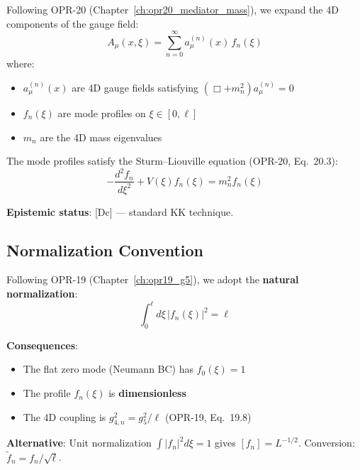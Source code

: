 Following OPR-20 (Chapter~\ref{ch:opr20_mediator_mass}), we expand the 4D components
of the gauge field:
\begin{equation}
    A_\mu(x,\xi) = \sum_{n=0}^{\infty} a_\mu^{(n)}(x) \, f_n(\xi)
    \label{eq:ch19_kk_expansion}
\end{equation}
where:
\begin{itemize}
    \item $a_\mu^{(n)}(x)$ are 4D gauge fields satisfying $(\Box + m_n^2) a_\mu^{(n)} = 0$
    \item $f_n(\xi)$ are mode profiles on $\xi \in [0, \ell]$
    \item $m_n$ are the 4D mass eigenvalues
\end{itemize}

The mode profiles satisfy the Sturm--Liouville equation (OPR-20, Eq.~20.3):
\begin{equation}
    -\frac{d^2 f_n}{d\xi^2} + V(\xi) f_n(\xi) = m_n^2 f_n(\xi)
    \label{eq:ch19_sl_equation}
\end{equation}

\textbf{Epistemic status}: [Dc] --- standard KK technique.

\subsection{Normalization Convention}
\label{sec:ch19_normalization}

\begin{tcolorbox}[colback=green!5!white, colframe=green!50!black,
    title=\textbf{Key Convention: Natural Normalization}]

Following OPR-19 (Chapter~\ref{ch:opr19_g5}), we adopt the \textbf{natural normalization}:
\begin{equation}
    \int_0^\ell d\xi \, |f_n(\xi)|^2 = \ell
    \label{eq:ch19_natural_norm}
\end{equation}

\textbf{Consequences}:
\begin{itemize}
    \item The flat zero mode (Neumann BC) has $f_0(\xi) = 1$
    \item The profile $f_n(\xi)$ is \textbf{dimensionless}
    \item The 4D coupling is $g_{4,n}^2 = g_5^2 / \ell$ (OPR-19, Eq.~19.8)
\end{itemize}

\textbf{Alternative}: Unit normalization $\int |f_n|^2 d\xi = 1$ gives $[f_n] = L^{-1/2}$.
Conversion: $\tilde{f}_n = f_n / \sqrt{\ell}$.

\end{tcolorbox}

